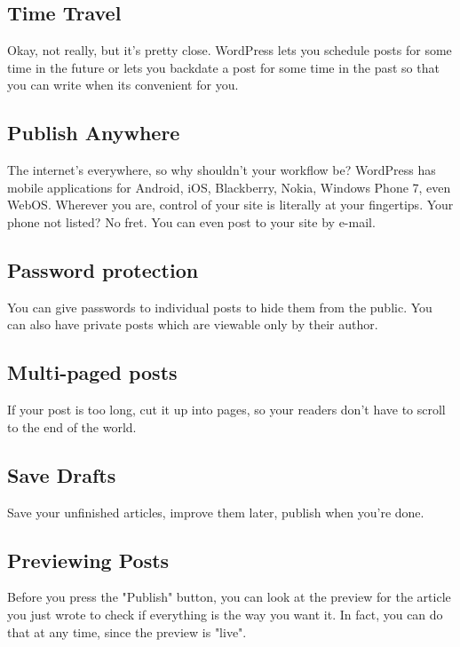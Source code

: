 \subsection{Time Travel}

Okay, not really, but it’s pretty close. WordPress lets you schedule posts for some time in the future or lets you backdate a post for some time in the past so that you can write when its convenient for you.

\subsection{Publish Anywhere}

The internet’s everywhere, so why shouldn’t your workflow be? WordPress has mobile applications for Android, iOS, Blackberry, Nokia, Windows Phone 7, even WebOS. Wherever you are, control of your site is literally at your fingertips. Your phone not listed? No fret. You can even post to your site by e-mail.

\subsection{Password protection}

You can give passwords to individual posts to hide them from the public. You can also have private posts which are viewable only by their author.

\subsection{Multi-paged posts}

If your post is too long, cut it up into pages, so your readers don't have to scroll to the end of the world.

\subsection{Save Drafts}

Save your unfinished articles, improve them later, publish when you're done.

\subsection{Previewing Posts}

Before you press the "Publish" button, you can look at the preview for the article you just wrote to check if everything is the way you want it. In fact, you can do that at any time, since the preview is "live".

